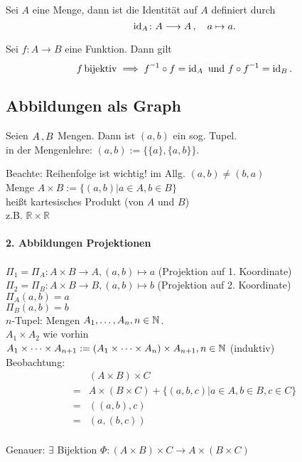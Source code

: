 \documentclass[../ana1.tex]{subfiles}
\begin{document}
\begin{defi*}[Identitätsabbildung]
	Sei \(A\) eine Menge, dann ist die Identität auf \(A\) definiert durch
	\[\operatorname{id}_{A} \colon A \longrightarrow A \operatorname{,} \quad a \mapsto a.\]
\end{defi*}


\begin{bem}
	Sei \(f \colon A \longrightarrow B\) eine Funktion. Dann gilt
	\[f \bijektiv \implies \inverse{f} \circ f = \id_{A} \text{ und } f \circ \inverse{f} = \id_{B}.\]
\end{bem}


\subsection{Abbildungen als Graph}

\begin{defi}
	Seien \(A \operatorname{,} B\) Mengen. Dann ist $(a,b)$ ein sog. Tupel.\\
	in der Mengenlehre: $(a,b) := \{\{a\}, \{a,b\}\}$.
\end{defi}

Beachte: Reihenfolge ist wichtig! im Allg. $(a,b)\neq (b,a)$\\
Menge $A\times B := \{(a,b)|a\in A, b\in B\}$\\
heißt kartesisches Produkt (von $A$ und $B$)\\
z.B. $\mathbb{R}\times\mathbb{R}$\\
\\
\textbf{2. Abbildungen Projektionen}\\
\\
\(\Pi_1 = \Pi_A : A\times B \rightarrow A, (a,b)\mapsto a\) (Projektion auf 1. Koordinate)\\
\(\Pi_2 = \Pi_B : A\times B \rightarrow B, (a,b) \mapsto b\) (Projektion auf 2. Koordinate)\\
\(\Pi_A(a,b) = a\) \\
\(\Pi_B(a,b) = b\) \\
\(n\)-Tupel: Mengen \(A_1,\dots ,A_n, n\in \mathbb{N} \).\\
\(A_1\times A_2\) wie vorhin\\
\(A_1\times\cdots\times A_{n+1} := (A_1\times\cdots\times A_n)\times A_{n+1}, n\in \mathbb{N} \) (induktiv)\\
Beobachtung:\\
\begin{align*}
	&(A\times B)\times C\\
	=& A\times (B\times C) + \{(a,b,c)|a\in A, b\in B, c\in C\} \\
	=& ((a,b),c)\\
	=& (a,(b,c))
\end{align*}
\[ \] \\
Genauer: \( \exists \) Bijektion \(\Phi : (A\times B) \times C \rightarrow A\times (B\times C)\)
\end{document}
